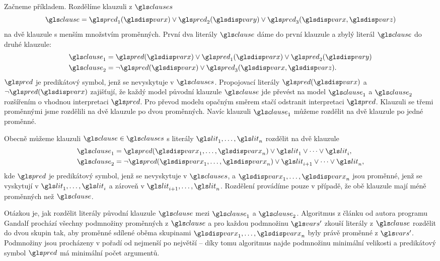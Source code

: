 Začneme příkladem. Rozdělíme klauzuli z $\clauses$
\[
\clause = \pred_1(\var) \vee \pred_2(\varY) \vee \pred_3(\var, \varZ)
\]
na dvě klauzule s menším množstvím proměnných.
První dva literály $\clause$ dáme do první klauzule
a zbylý literál $\clause$ do druhé klauzule:
\begin{align*}
  \clause_1 &= \pred(\var) \vee \pred_1(\var) \vee \pred_2(\varY) \\
  \clause_2 &= \neg \pred(\var) \vee \pred_3(\var, \varZ).
\end{align*}
$\pred$ je predikátový symbol, jenž se nevyskytuje v $\clauses$.
Propojovací literály $\pred(\var)$ a $\neg \pred(\var)$ zajišťují,
že každý model původní klauzule $\clause$ jde převést na model
$\clause_1$ a $\clause_2$ rozšířením o vhodnou interpretaci $\pred$.
Pro převod modelu opačným směrem stačí odstranit interpretaci $\pred$.
Klauzuli se třemi proměnnými jsme rozdělili na dvě klauzule po dvou
proměnných. Navíc klauzuli $\clause_1$ můžeme rozdělit
na dvě klauzule po jedné proměnné.

Obecně můžeme klauzuli $\clause \in \clauses$ s literály
$\lit_1 \comdots \lit_n$ rozdělit na dvě klauzule
\begin{align*}
  \clause_1 &= \pred(\var_1 \comdots \var_n) \vee
    \lit_1 \vee \cdots \vee \lit_i, \\
  \clause_2 &= \neg \pred(\var_1 \comdots \var_n) \vee
    \lit_{i+1} \vee \cdots \vee \lit_n,
\end{align*}
kde $\pred$ je predikátový symbol, jenž se nevyskytuje v $\clauses$,
a $\var_1 \comdots \var_n$ jsou proměnné, jenž se vyskytují v
$\lit_1 \comdots \lit_i$ a zároveň v $\lit_{i+1} \comdots \lit_n$.
Rozdělení provádíme pouze v případě, že obě klauzule mají
méně proměnných než $\clause$.

Otázkou je, jak rozdělit literály původní klauzule $\clause$ mezi
$\clause_1$ a $\clause_2$. Algoritmus z článku \cite{tammet03}
od autora programu Gandalf prochází všechny podmnožiny
proměnných z $\clause$ a pro každou podmnožinu $\vars'$
zkouší literály z $\clause$ rozdělit do dvou skupin tak,
aby proměnné sdílené oběma skupinami $\var_1 \comdots \var_n$
byly právě proměnné z $\vars'$. Podmnožiny jsou procházeny
v pořadí od nejmenší po největší -- díky tomu algoritmus
najde podmnožinu minimální velikosti
a predikátový symbol $\pred$ má minimální počet argumentů.


